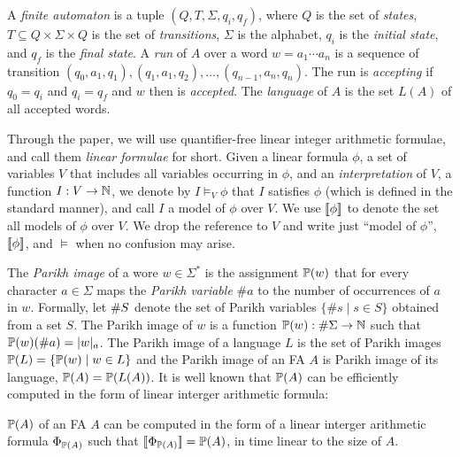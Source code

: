 \documentclass[sigplan,review,anonymous]{acmart}\settopmatter{printfolios=true,printccs=false,printacmref=false}
\begin{document}
A \emph{finite automaton} is a tuple $(Q,T,\Sigma,q_i,q_f)$, where $Q$ is the set of \emph{states}, $T\subseteq Q\times \Sigma \times Q $ is the set of \emph{transitions}, $\Sigma$ is the alphabet, $q_i$ is the \emph{initial state}, and $q_f$ is the \emph{final state}. 
A \emph{run} of $A$ over a word $w = a_1\cdots a_n$ is a sequence of transition $(q_0,a_1,q_1),(q_1,a_1,q_2),\ldots,(q_{n-1},a_n,q_n)$. The run  is \emph{accepting} if $q_0 = q_i$ and $q_i = q_f$ and $w$ then is \emph{accepted}.
The \emph{language} of $A$ is the set $L(A)$ of all accepted words.

Through the paper, we will use quantifier-free linear integer arithmetic formulae, and call them \emph{linear formulae} for short.   
Given a linear formula $\phi$, a set of variables $V$ that includes all variables occurring in $\phi$, and an \emph{interpretation} of $V$, a function $I:V\rightarrow \mathbb{N}$, 
we denote by $I\models_V \phi$ that $I$ satisfies $\phi$ (which is defined in the standard manner), and call $I$ a model of $\phi$ over $V$.
We use $[\![\phi]\!]$ to denote the set all models of $\phi$ over $V$. 
We drop the reference to $V$ and write just ``model of $\phi$'',  $[\![\phi]\!]$, and $\models$ when no confusion may arise.

The \emph{Parikh image} of a wore $w\in \Sigma^*$ is the assignment 
$\mathbb{P}{(w)}$ that for every character $a\in\Sigma$ maps the \emph{Parikh variable} $\#a$ to the number of occurrences of $a$ in $w$.
Formally, let $\#{S}$ denote the set of Parikh variables $\{\#s \mid s\in S\}$ obtained from a set $S$. 
The Parikh image of $w$ is a function $\mathbb{P}{(w)}:\#{\Sigma} \rightarrow \mathbb{N}$ such that $\mathbb{P}{(w)} (\#a) = |w|_a$. 
The Parikh image of a language $L$ is the set of Parikh images $\mathbb{P}{(L)} = \{\mathbb{P}{(w)} \mid w \in  L\}$ and the Parikh image of an FA $A$ is Parikh image of its language, $\mathbb{P}{(A)} = \mathbb{P}{(L(A))}$. 
%
It is well known that $\mathbb{P}{(A)}$ can be efficiently computed in the form of linear interger arithmetic formula:


\begin{lemma}
$\mathbb{P}{(A)}$ of an FA $A$ can be computed in the form of a linear interger arithmetic formula  $\Phi_{\mathbb{P}{(A)}}$ such that $[\![\Phi_{\mathbb{P}{(A)}}]\!] = \mathbb{P}{(A)}$, in time linear to the size of $A$.
\end{lemma}



 
\end{document}

